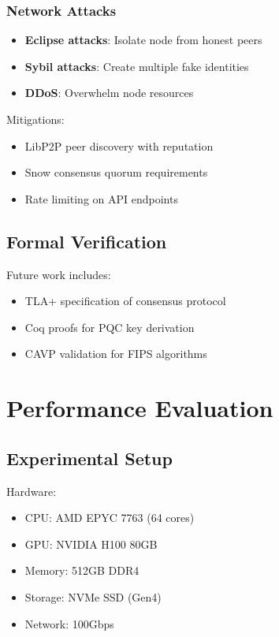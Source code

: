 \documentclass[11pt,twocolumn]{article}
\begin{document}
\subsubsection{Network Attacks}

\begin{itemize}
\item \textbf{Eclipse attacks}: Isolate node from honest peers
\item \textbf{Sybil attacks}: Create multiple fake identities
\item \textbf{DDoS}: Overwhelm node resources
\end{itemize}

Mitigations:
\begin{itemize}
\item LibP2P peer discovery with reputation
\item Snow consensus quorum requirements
\item Rate limiting on API endpoints
\end{itemize}

\subsection{Formal Verification}

Future work includes:
\begin{itemize}
\item TLA+ specification of consensus protocol
\item Coq proofs for PQC key derivation
\item CAVP validation for FIPS algorithms
\end{itemize}

\section{Performance Evaluation}

\subsection{Experimental Setup}

Hardware:
\begin{itemize}
\item CPU: AMD EPYC 7763 (64 cores)
\item GPU: NVIDIA H100 80GB
\item Memory: 512GB DDR4
\item Storage: NVMe SSD (Gen4)
\item Network: 100Gbps
\end{itemize}
\end{document}
